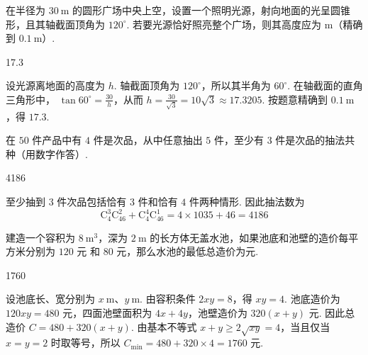 \begin{problem}
在半径为 \(30 \mathrm{~m}\) 的圆形广场中央上空，设置一个照明光源，射向地面的光呈圆锥形，且其轴截面顶角为 \(120^{\circ}\). 若要光源恰好照亮整个广场，则其高度应为\fillinblank{} \(\mathrm{m}\)（精确到 \(0.1 \mathrm{~m}\)）.
\end{problem}

\begin{answer}
17.3
\end{answer}

\begin{solution}
设光源离地面的高度为 \(h\). 轴截面顶角为 \(120^\circ\)，所以其半角为
\(60^\circ\). 在轴截面的直角三角形中，
\(\tan60^\circ=\frac{30}{h}\)，从而
\(h=\frac{30}{\sqrt3}=10\sqrt3\approx17.3205\). 按题意精确到
\(0.1\mathrm{~m}\)，得 \(17.3\).
\end{solution}

\begin{problem}
在 \(50\) 件产品中有 \(4\) 件是次品，从中任意抽出 \(5\) 件，至少有 \(3\) 件是次品的抽法共\fillinblank{}\(\text{种}\)（用数字作答）.
\end{problem}

\begin{answer}
4186
\end{answer}

\begin{solution}
至少抽到 \(3\) 件次品包括恰有 \(3\) 件和恰有 \(4\) 件两种情形. 因此抽法数为
\[
\mathrm C_4^3\mathrm C_{46}^2+\mathrm C_4^4\mathrm C_{46}^1
=4\times1035+46=4186
\]
\end{solution}

\begin{problem}
建造一个容积为 \(8 \mathrm{~m}^{3}\)，深为 \(2 \mathrm{~m}\) 的长方体无盖水池，如果池底和池壁的造价每平方米分别为 \(120\text{ 元}\) 和 \(80\text{ 元}\)，那么水池的最低总造价为\fillinblank{}\(\text{元}\).
\end{problem}

\begin{answer}
1760
\end{answer}

\begin{solution}
设池底长、宽分别为 \(x\mathrm{~m}\)、\(y\mathrm{~m}\). 由容积条件
\(2xy=8\)，得 \(xy=4\). 池底造价为 \(120xy=480\) 元，四面池壁面积为
\(4x+4y\)，池壁造价为 \(320(x+y)\) 元. 因此总造价
\(C=480+320(x+y)\). 由基本不等式
\(x+y\geqslant2\sqrt{xy}=4\)，当且仅当 \(x=y=2\) 时取等号，所以
\(C_{\min}=480+320\times4=1760\) 元.
\end{solution}

